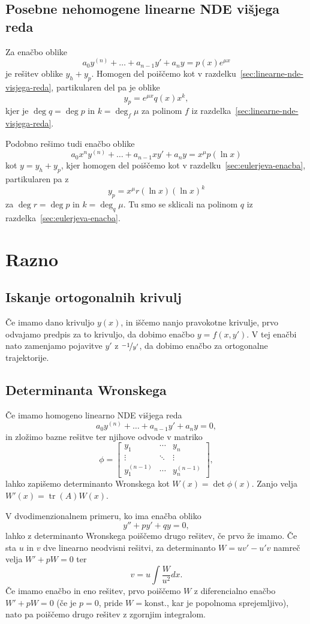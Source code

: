 \subsection{Posebne nehomogene linearne NDE višjega reda}%
\label{sec:posebne-nde-visjega-reda}

Za enačbo oblike
\[
  a_0 y^{(n)} + \ldots + a_{n-1} y' + a_n y = p(x) e^{\mu x}
\]
je rešitev oblike $y_h + y_p$.
Homogen del poiščemo kot v razdelku~\ref{sec:linearne-nde-visjega-reda},
partikularen del pa je oblike
\[
  y_p = e^{\mu x} q(x) x^k,
\]
kjer je $\deg q = \deg p$ in $k = \deg_f \mu$ za polinom $f$ iz
razdelka~\ref{sec:linearne-nde-visjega-reda}.

Podobno rešimo tudi enačbo oblike
\[
  a_0 x^n y^{(n)} + \ldots + a_{n-1} x y' + a_n y = x^\mu p(\ln x)
\]
kot $y = y_h + y_p$, kjer homogen del poiščemo kot v
razdelku~\ref{sec:eulerjeva-enacba}, partikularen pa z
\[
  y_p = x^\mu r(\ln x) (\ln x)^k
\]
za $\deg r = \deg p$ in $k = \deg_q \mu$.
Tu smo se sklicali na polinom $q$ iz razdelka~\ref{sec:eulerjeva-enacba}.

\section{Razno}%

\subsection{Iskanje ortogonalnih krivulj}

Če imamo dano krivuljo $y(x)$, in iščemo nanjo pravokotne krivulje, prvo
odvajamo predpis za to krivuljo, da dobimo enačbo $y = f(x, y')$.
V tej enačbi nato zamenjamo pojavitve $y'$ z $\nicefrac{-1}{y'}$, da dobimo
enačbo za ortogonalne trajektorije.

\subsection{Determinanta Wronskega}

Če imamo homogeno linearno NDE višjega reda
\[
  a_0 y^{(n)} + \ldots + a_{n-1} y' + a_n y = 0,
\]
in zložimo bazne rešitve ter njihove odvode v matriko
\[
  \phi
  =
  \begin{bmatrix}
	y_1 & \cdots & y_n \\
	\vdots & \ddots & \vdots \\
	y_1^{(n-1)} & \cdots & y_n^{(n-1)}
  \end{bmatrix},
\]
lahko zapišemo determinanto Wronskega kot $W(x) = \det \phi(x)$.
Zanjo velja $W'(x) = \operatorname{tr}(A) W(x)$.

V dvodimenzionalnem primeru, ko ima enačba obliko
\[
  y'' + py' + qy = 0,
\]
lahko z determinanto Wronskega poiščemo drugo rešitev, če prvo že imamo.
Če sta $u$ in $v$ dve linearno neodvisni rešitvi, za determinanto $W = uv' -
u'v$ namreč velja $W' + pW = 0$ ter
\[
  v = u \int \frac{W}{u^2} dx.
\]
Če imamo enačbo in eno rešitev, prvo poiščemo $W$ z diferencialno enačbo $W' +
pW = 0$ (če je $p=0$, pride $W=\text{konst.}$, kar je popolnoma sprejemljivo),
nato pa poiščemo drugo rešitev z zgornjim integralom.

